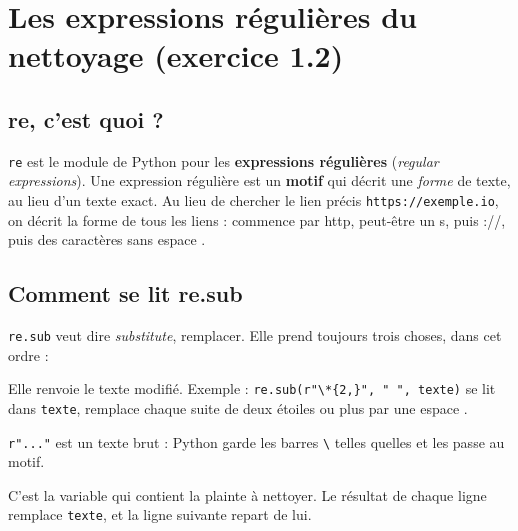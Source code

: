 \section{Les expressions régulières du nettoyage (exercice 1.2)}

\subsection{re, c'est quoi ?}

\texttt{re} est le module de Python pour les \textbf{expressions régulières} (\emph{regular expressions}).
Une expression régulière est un \textbf{motif} qui décrit une \emph{forme} de texte, au lieu d'un texte
exact. Au lieu de chercher le lien précis \texttt{https://exemple.io}, on décrit la forme de tous les liens :
\og commence par http, peut-être un s, puis ://, puis des caractères sans espace \fg.

\subsection{Comment se lit re.sub}

\texttt{re.sub} veut dire \emph{substitute}, remplacer. Elle prend toujours trois choses, dans cet ordre :
\begin{center}
\end{center}
Elle renvoie le texte modifié. Exemple : \verb|re.sub(r"\*{2,}", " ", texte)| se lit \og dans
\texttt{texte}, remplace chaque suite de deux étoiles ou plus par une espace \fg.

\begin{tcbraster}[raster columns=2, raster equal height, raster column skip=8pt, raster every box/.style={unbreakable}]
\begin{conceptbox}[title={Le \texttt{r} devant le motif}, unbreakable]
\small \verb|r"..."| est un texte \og brut \fg{} : Python garde les barres \verb|\| telles quelles et les
passe au motif.
\end{conceptbox}
\begin{conceptbox}[title={\texttt{texte}, à la fin}, unbreakable]
\small C'est la variable qui contient la plainte à nettoyer. Le résultat de chaque ligne remplace
\texttt{texte}, et la ligne suivante repart de lui.
\end{conceptbox}
\end{tcbraster}


